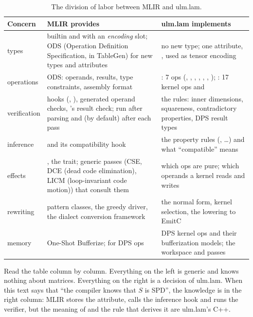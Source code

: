 \begin{table}[h]
\centering\small
\begin{tabularx}{\linewidth}{@{}P{2.4cm}LL@{}}
\toprule
\textbf{Concern} & \textbf{MLIR provides} & \textbf{ulm.lam implements} \\
\midrule
types & builtin  and  with an \emph{encoding}
  slot; ODS (Operation Definition Specification, in TableGen) for new
  types and attributes &
  no new type; one attribute, , used as tensor
  encoding \\
operations & ODS: operands, results, type constraints, assembly format &
  : 7 ops (, , ,
  , , , );
  : 17 kernel ops and  \\
verification & hooks (, ), generated
  operand checks, 's result check; run after
  parsing and (by default) after each pass &
  the rules: inner dimensions, squareness, contradictory properties, DPS
  result types \\
inference &  and its compatibility hook
   & the property rules (,
  \ldots) and what ``compatible'' means \\
effects & , the  trait; generic
  passes (CSE, DCE (dead code elimination), LICM (loop-invariant code
  motion)) that consult them & which ops are pure; which
  operands a kernel reads and writes \\
rewriting & pattern classes, the greedy driver, the dialect conversion
  framework & the normal form, kernel selection, the lowering to EmitC \\
memory & One-Shot Bufferize; 
  for DPS ops & DPS kernel ops and their bufferization models; the
  workspace and  passes \\
\bottomrule
\end{tabularx}
\caption{The division of labor between MLIR and ulm.lam.}
\label{tab:infra-who}
\end{table}

Read the table column by column. Everything on the left is generic and
knows nothing about matrices. Everything on the right is a decision of
ulm.lam. When this text says that ``the compiler knows that \(S\) is SPD'',
the knowledge is in the right column: MLIR stores the attribute, calls the
inference hook and runs the verifier, but the meaning of  and the
rule that derives it are ulm.lam's C++.

